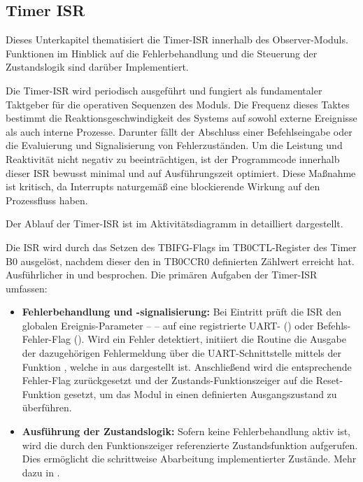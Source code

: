 
\newpage
\subsection{Timer ISR}
\label{sec:Timer_ISR}

Dieses Unterkapitel thematisiert die Timer-ISR innerhalb des Observer-Moduls. Funktionen im Hinblick auf die Fehlerbehandlung und die Steuerung der Zustandslogik sind dar\"uber Implementiert.

Die Timer-ISR wird periodisch ausgef\"uhrt und fungiert als fundamentaler Taktgeber f\"ur die operativen Sequenzen des Moduls. Die Frequenz dieses Taktes bestimmt die Reaktionsgeschwindigkeit des Systems auf sowohl externe Ereignisse als auch interne Prozesse. Darunter f\"allt der Abschluss einer Befehlseingabe oder die Evaluierung und Signalisierung von Fehlerzust\"anden. Um die Leistung und Reaktivit\"at nicht negativ zu beeintr\"achtigen, ist der Programmcode innerhalb dieser ISR bewusst minimal und auf Ausf\"uhrungszeit optimiert. Diese Ma{\ss}nahme ist kritisch, da Interrupts naturgem\"a{\ss} eine blockierende Wirkung auf den Prozessfluss haben.

Der Ablauf der Timer-ISR ist im Aktivit\"atsdiagramm in  detailliert dargestellt. 

Die ISR wird durch das Setzen des TBIFG-Flags im TB0CTL-Register des Timer B0 ausgel\"ost, nachdem dieser den in TB0CCR0 definierten Z\"ahlwert erreicht hat. Ausf\"uhrlicher in  und  besprochen. Die prim\"aren Aufgaben der Timer-ISR umfassen:

\begin{itemize}
	\item \textbf{Fehlerbehandlung und -signalisierung:} Bei Eintritt pr\"uft die ISR den globalen Ereignis-Parameter --  -- auf eine registrierte UART- () oder Befehls-Fehler-Flag (). Wird ein Fehler detektiert, initiiert die Routine die Ausgabe der dazugeh\"origen Fehlermeldung \"uber die UART-Schnittstelle mittels der Funktion , welche in  aus  dargestellt ist. Anschlie{\ss}end wird die entsprechende Fehler-Flag zur\"uckgesetzt und der Zustands-Funktionszeiger  auf die Reset-Funktion  gesetzt, um das Modul in einen definierten Ausgangszustand zu \"uberf\"uhren.

	\item \textbf{Ausf\"uhrung der Zustandslogik:} Sofern keine Fehlerbehandlung aktiv ist, wird die durch den Funktionszeiger  referenzierte Zustandsfunktion aufgerufen. Dies erm\"oglicht die schrittweise Abarbeitung implementierter Zust\"ande. Mehr dazu in .
\end{itemize}

